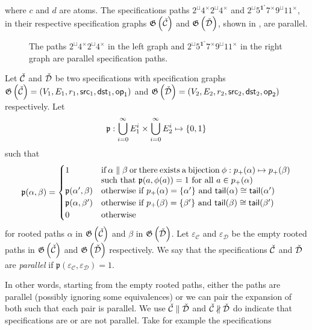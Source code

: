 where $c$ and $d$ are atoms. The specifications paths $2^\sqcup4^\times2^\sqcup4^\times$ and $2^\sqcup5^{\mathbf{1}^\circ}7^\times9^\sqcup11^\times$, in their respective specification graphs $\mathfrak{G}\left(\check{\mathcal{C}}\right)$ and $\mathfrak{G}\left(\check{\mathcal{D}}\right)$, shown in , are parallel.
\begin{figure}[ht!]
    \centering
    
    \caption{The paths $2^\sqcup4^\times2^\sqcup4^\times$ in the left graph and $2^\sqcup5^{\mathbf{1}^\circ}7^\times9^\sqcup11^\times$ in the right graph are parallel specification paths.}
    \label{fig:para_path}
\end{figure}
\begin{definition}\label{def:parspec}
Let $\check{\mathcal{C}}$ and $\check{\mathcal{D}}$ be two specifications with specification graphs $\mathfrak{G}\left(\check{\mathcal{C}}\right) = (V_1,E_1,r_1,\textsf{src}_1,\textsf{dst}_1,\textsf{op}_1)$ and $\mathfrak{G}\left(\check{\mathcal{D}}\right) = (V_2,E_2,r_2,\textsf{src}_2,\textsf{dst}_2,\textsf{op}_2)$ respectively. Let 
\[
    \mathfrak{p}: \bigcup_{i=0}^\infty E_1^i \times \bigcup_{i=0}^\infty E_2^i \mapsto \left\{0,1\right\}
\]
such that
\[
\mathfrak{p}(\alpha,\beta) = \begin{cases}
1 & \parbox[t]{.65\textwidth}{if $\alpha \parallel \beta$ or there exists a bijection $\phi: p_+(\alpha) \mapsto p_+(\beta)$ such that $\mathfrak{p}(a,\phi(a)) = 1$ for all $a\in p_+(\alpha)$}\\
\mathfrak{p}(\alpha',\beta) & \parbox[t]{.65\textwidth}{otherwise if $p_+(\alpha) = \set{\alpha'}$ and $\textsf{tail}(\alpha) \cong \textsf{tail}(\alpha')$}\\
\mathfrak{p}(\alpha,\beta') & \parbox[t]{.65\textwidth}{otherwise if $p_+(\beta) = \set{\beta'}$ and $\textsf{tail}(\beta) \cong \textsf{tail}(\beta')$}\\
0 & \text{otherwise}
\end{cases}
\]
for rooted paths $\alpha$ in $\mathfrak{G}\left(\check{\mathcal{C}}\right)$ and $\beta$ in $\mathfrak{G}\left(\check{\mathcal{D}}\right)$. Let $\varepsilon_\mathcal{C}$ and $\varepsilon_\mathcal{D}$ be the empty rooted paths in $\mathfrak{G}\left(\check{\mathcal{C}}\right)$ and $\mathfrak{G}\left(\check{\mathcal{D}}\right)$ respectively. We say that the specifications $\check{\mathcal{C}}$ and $\check{\mathcal{D}}$ are \emph{parallel} if $\mathfrak{p}\left(\varepsilon_\mathcal{C},\varepsilon_\mathcal{D}\right) = 1$.
\end{definition}
In other words, starting from the empty rooted paths, either the paths are parallel (possibly ignoring some equivalences) or we can pair the expansion of both such that each pair is parallel. We use $\check{\mathcal{C}} \parallel \check{\mathcal{D}}$ and $\check{\mathcal{C}} \nparallel \check{\mathcal{D}}$ do indicate that specifications are or are not parallel. Take for example the specifications
